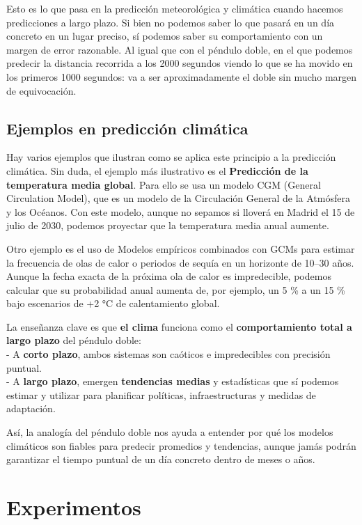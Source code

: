 \documentclass[
  10pt,
  a4paper,
  DIV=11,
  numbers=noendperiod,
  open=any]{scrreprt}
\numberwithin{equation}{chapter}
\numberwithin{equation}{chapter}
\renewcommand{\[}{\begin{equation}}
\renewcommand{\]}{\end{equation}}
\begin{document}
Esto es lo que pasa en la predicción meteorológica y climática cuando
hacemos predicciones a largo plazo. Si bien no podemos saber lo que
pasará en un día concreto en un lugar preciso, sí podemos saber su
comportamiento con un margen de error razonable. Al igual que con el
péndulo doble, en el que podemos predecir la distancia recorrida a los
2000 segundos viendo lo que se ha movido en los primeros 1000 segundos:
va a ser aproximadamente el doble sin mucho margen de equivocación.

\section{Ejemplos en predicción
climática}\label{ejemplos-en-predicciuxf3n-climuxe1tica}

Hay varios ejemplos que ilustran como se aplica este principio a la
predicción climática. Sin duda, el ejemplo más ilustrativo es el
\textbf{Predicción de la temperatura media global}. Para ello se usa un
modelo CGM (General Circulation Model), que es un modelo de la
Circulación General de la Atmósfera y los Océanos. Con este modelo,
aunque no sepamos si lloverá en Madrid el 15 de julio de 2030, podemos
proyectar que la temperatura media anual aumente.

Otro ejemplo es el uso de Modelos empíricos combinados con GCMs para
estimar la frecuencia de olas de calor o periodos de sequía en un
horizonte de 10--30 años. Aunque la fecha exacta de la próxima ola de
calor es impredecible, podemos calcular que su probabilidad anual
aumenta de, por ejemplo, un 5 \% a un 15 \% bajo escenarios de +2 °C de
calentamiento global.

La enseñanza clave es que \textbf{el clima} funciona como el
\textbf{comportamiento total a largo plazo} del péndulo doble:\\
- A \textbf{corto plazo}, ambos sistemas son caóticos e impredecibles
con precisión puntual.\\
- A \textbf{largo plazo}, emergen \textbf{tendencias medias} y
estadísticas que sí podemos estimar y utilizar para planificar
políticas, infraestructuras y medidas de adaptación.

Así, la analogía del péndulo doble nos ayuda a entender por qué los
modelos climáticos son fiables para predecir promedios y tendencias,
aunque jamás podrán garantizar el tiempo puntual de un día concreto
dentro de meses o años.


\chapter{Experimentos}\label{experimentos}
\end{document}
